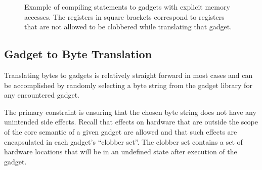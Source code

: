     \begin{figure}
        \centering
        \caption{Example of compiling statements to gadgets with explicit memory
        accesses. The registers in square brackets correspond to registers that
        are not allowed to be clobbered while translating that gadget.}
        \label{fig:method-direct-to-gadget}
    \end{figure}

    \subsection{Gadget to Byte Translation}

    Translating bytes to gadgets is relatively straight forward in most cases
    and can be accomplished by randomly selecting a byte string from the gadget
    library for any encountered gadget.

    The primary constraint is ensuring that the chosen byte string does not have
    any unintended side effects. Recall that effects on hardware that are
    outside the scope of the core semantic of a given gadget are allowed and
    that such effects are encapsulated in each gadget's ``clobber set''. The
    clobber set contains a set of hardware locations that will be in an
    undefined state after execution of the gadget.

